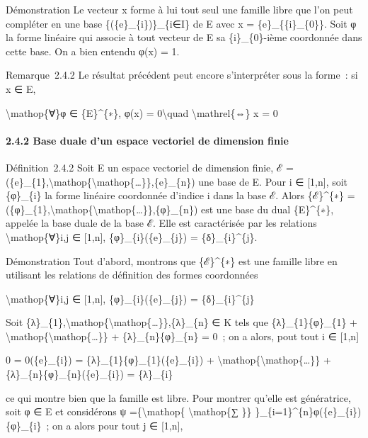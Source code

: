 \documentclass[]{article}
\begin{document}
Démonstration Le vecteur x forme à lui tout seul une famille libre que
l'on peut compléter en une base \{(\{e\}\_\{i\})\}\_\{i∈I\} de E avec x
= \{e\}\_\{\{i\}\_\{0\}\}. Soit φ la forme linéaire qui associe à tout
vecteur de E sa \{i\}\_\{0\}-ième coordonnée dans cette base. On a bien
entendu φ(x) = 1.

Remarque~2.4.2 Le résultat précédent peut encore s'interpréter sous la
forme~: si x ∈ E,

\textbackslash{}mathop\{∀\}φ ∈ \{E\}\^{}\{∗\}, φ(x) =
0\textbackslash{}quad \textbackslash{}mathrel\{⇔\} x = 0

\paragraph{2.4.2 Base duale d'un espace vectoriel de dimension finie}

Définition~2.4.2 Soit E un espace vectoriel de dimension finie, ℰ =
(\{e\}\_\{1\},\textbackslash{}mathop\{\textbackslash{}mathop\{\ldots{}\}\},\{e\}\_\{n\})
une base de E. Pour i ∈ {[}1,n{]}, soit \{φ\}\_\{i\} la forme linéaire
coordonnée d'indice i dans la base ℰ. Alors \{ℰ\}\^{}\{∗\} =
(\{φ\}\_\{1\},\textbackslash{}mathop\{\textbackslash{}mathop\{\ldots{}\}\},\{φ\}\_\{n\})
est une base du dual \{E\}\^{}\{∗\}, appelée la base duale de la base ℰ.
Elle est caractérisée par les relations \textbackslash{}mathop\{∀\}i,j ∈
{[}1,n{]}, \{φ\}\_\{i\}(\{e\}\_\{j\}) = \{δ\}\_\{i\}\^{}\{j\}.

Démonstration Tout d'abord, montrons que \{ℰ\}\^{}\{∗\} est une famille
libre en utilisant les relations de définition des formes coordonnées

\textbackslash{}mathop\{∀\}i,j ∈ {[}1,n{]}, \{φ\}\_\{i\}(\{e\}\_\{j\}) =
\{δ\}\_\{i\}\^{}\{j\}

Soit
\{λ\}\_\{1\},\textbackslash{}mathop\{\textbackslash{}mathop\{\ldots{}\}\},\{λ\}\_\{n\}
∈ K tels que \{λ\}\_\{1\}\{φ\}\_\{1\} +
\textbackslash{}mathop\{\textbackslash{}mathop\{\ldots{}\}\} +
\{λ\}\_\{n\}\{φ\}\_\{n\} = 0~; on a alors, pout tout i ∈ {[}1,n{]}

0 = 0(\{e\}\_\{i\}) = \{λ\}\_\{1\}\{φ\}\_\{1\}(\{e\}\_\{i\}) +
\textbackslash{}mathop\{\textbackslash{}mathop\{\ldots{}\}\} +
\{λ\}\_\{n\}\{φ\}\_\{n\}(\{e\}\_\{i\}) = \{λ\}\_\{i\}

ce qui montre bien que la famille est libre. Pour montrer qu'elle est
génératrice, soit φ ∈ E et considérons ψ =\{\textbackslash{}mathop\{
\textbackslash{}mathop\{∑ \}\}
\}\_\{i=1\}\^{}\{n\}φ(\{e\}\_\{i\})\{φ\}\_\{i\}~; on a alors pour tout j
∈ {[}1,n{]},
\end{document}
